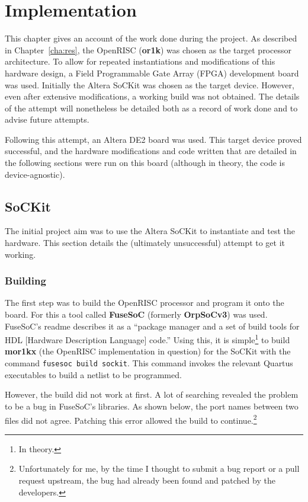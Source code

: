 \chapter{Implementation}
\label{cha:imp}

This chapter gives an account of the work done during the project. As described in Chapter~\ref{cha:res}, the OpenRISC (\textbf{or1k}) was chosen as the target processor architecture. To allow for repeated instantiations and modifications of this hardware design, a Field Programmable Gate Array (FPGA) development board was used. Initially the Altera SoCKit\cite{sockit} was chosen as the target device. However, even after extensive modifications, a working build was not obtained. The details of the attempt will nonetheless be detailed both as a record of work done and to advise future attempts.

Following this attempt, an Altera DE2 board\cite{de2} was used. This target device proved successful, and the hardware modifications and code written that are detailed in the following sections were run on this board (although in theory, the code is device-agnostic).

\section{SoCKit}
\label{sec:sockit}
The initial project aim was to use the Altera SoCKit to instantiate and test the hardware.  This section details the (ultimately unsuccessful) attempt to get it working.

\subsection{Building}
The first step was to build the OpenRISC processor and program it onto the board. For this a tool called \textbf{FuseSoC}\cite{fusesoc} (formerly \textbf{OrpSoCv3}) was used. FuseSoC's readme describes it as a ``package manager and a set of build tools for HDL [Hardware Description Language] code.'' Using this, it is simple\footnote{In theory.} to build \textbf{mor1kx} (the OpenRISC implementation in question) for the SoCKit with the command \texttt{fusesoc build sockit}. This command invokes the relevant Quartus executables to build a netlist to be programmed.

However, the build did not work at first. A lot of searching revealed the problem to be a bug in FuseSoC's libraries. As shown below, the port names between two files did not agree. Patching this error allowed the build to continue.\footnote{Unfortunately for me, by the time I thought to submit a bug report or a pull request upstream, the bug had already been found and patched by the developers.}

